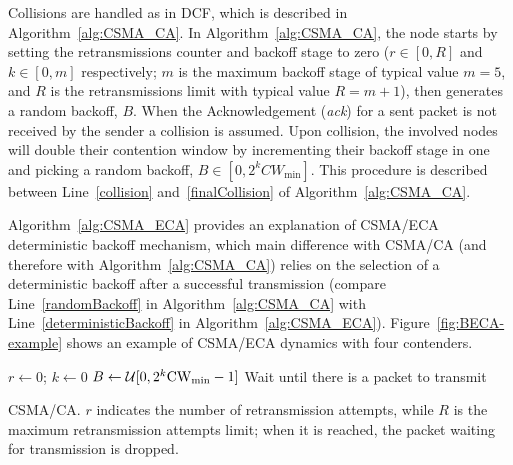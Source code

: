 \documentclass[a4paper,journal]{IEEEtran}
\begin{document}
Collisions are handled as in DCF, which is described in Algorithm~\ref{alg:CSMA_CA}. In Algorithm~\ref{alg:CSMA_CA}, the node starts by setting the retransmissions counter and backoff stage to zero ($r\in[0,R]$ and $k\in[0,m]$ respectively; $m$ is the maximum backoff stage of typical value $m=5$, and $R$ is the retransmissions limit with typical value $R=m+1$), then generates a random backoff, $B$. When the Acknowledgement (\emph{ack}) for a sent packet is not received by the sender a collision is assumed. Upon collision, the involved nodes will double their contention window by incrementing their backoff stage in one and picking a random backoff, $B\in[0,2^{k}CW_{\min}]$. This procedure is described between Line~\ref{collision} and~\ref{finalCollision} of Algorithm~\ref{alg:CSMA_CA}.

Algorithm~\ref{alg:CSMA_ECA} provides an explanation of CSMA/ECA deterministic backoff mechanism, which main difference with CSMA/CA (and therefore with Algorithm~\ref{alg:CSMA_CA}) relies on the selection of a deterministic backoff after a successful transmission (compare Line~\ref{randomBackoff} in Algorithm~\ref{alg:CSMA_CA} with Line~\ref{deterministicBackoff} in Algorithm~\ref{alg:CSMA_ECA}). Figure~\ref{fig:BECA-example} shows an example of CSMA/ECA dynamics with four contenders.

\begin{algorithm}[ht!!!]
{
  $r \leftarrow 0$; $k \leftarrow 0$\;
  $B \leftarrow \mathcal{U}[0,2^k{\rm{CW}_{min}}-1]$\;
  Wait until there is a packet to transmit\;
}
\caption{\small{CSMA/CA. $r$ indicates the number of retransmission attempts, while $R$ is the maximum retransmission attempts limit; when it is reached, the packet waiting for transmission is dropped.}}
\label{alg:CSMA_CA}
\end{algorithm}
\end{document}
